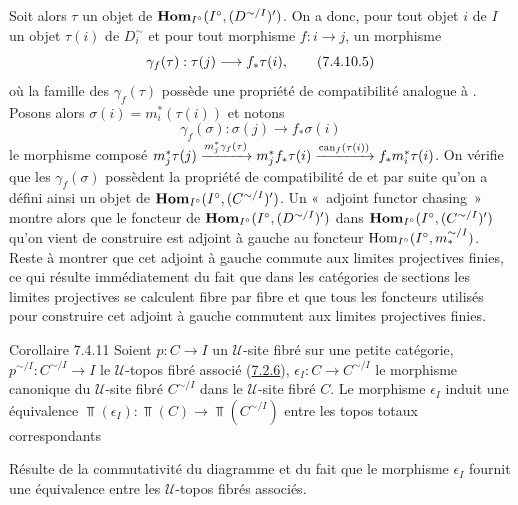 \documentclass[10pt]{../fichiers-configuration-latex/smfart}
\begin{document}
Soit alors $\tau$ un objet de $\operatorname{\mathbf{Hom}}_{I^{\circ}} (I^{\circ},
(D^{\sim/I})')$. On a donc, pour tout objet $i$ de $I$ un objet
$\tau(i)$ de $D^{\sim}_i$ et pour tout morphisme $f : i \to j$, un
morphisme
\begin{equation*}
\gamma_{f} (\tau) : \tau(j) \to f_{\ast} \tau(i){\quoi},\tag{7.4.10.5}
\end{equation*}
où la famille des $\gamma_f(\tau)$ possède une propriété de
compatibilité analogue à . Posons alors $\sigma(i) =
m^{\ast}_i (\tau(i))$ et notons
\begin{equation*}
\gamma_{f} (\sigma) : \sigma(j) \to f_{\ast} \sigma(i)\tag{7.4.10.6}
\end{equation*}
le morphisme composé $m^{\ast}_j \tau(j) \xrightarrow{m_j^{\ast}
  \gamma_f(\tau)} m_j^{\ast} f_{\ast} \tau(i) \xrightarrow{\operatorname{can}_f(\tau(i))}
f_{\ast} m^{\ast}_i \tau(i)$. On vérifie
  que les $\gamma_f(\sigma)$ possèdent la propriété de compatibilité
  de  et par suite qu'on a défini ainsi un objet de
  $\operatorname{\mathbf{Hom}}_{I^{\circ}}(I^{\circ}, (C^{\sim/I})')$. Un « adjoint functor
  chasing » montre alors que le foncteur de
  $\operatorname{\mathbf{Hom}}_{I^{\circ}}(I^{\circ}, (D^{\sim/I})')$ dans
  $\operatorname{\mathbf{Hom}}_{I^{\circ}}(I^{\circ}, (C^{\sim/I})')$ qu'on vient de
  construire est adjoint à gauche au foncteur
  $\operatorname{Hom}_{I^{\circ}}(I^{\circ}, m^{\sim/I}_{\ast})$. Reste à montrer
  que cet adjoint à gauche commute aux limites projectives finies, ce
  qui résulte immédiatement du fait que dans les catégories de
  sections les limites projectives se calculent fibre par fibre et que
  tous les foncteurs utilisés pour construire cet adjoint à gauche
  commutent aux limites projectives finies.

\begin{enonce*}{Corollaire 7.4.11}
Soient $p : C \to I$ un $𝒰$-site fibré sur une petite catégorie,
$p^{\sim/I} : C^{\sim/I} \to I$ le $𝒰$-topos fibré associé (\hyperref[VI.subsubsec7.2.6]{7.2.6}),
$\epsilon_I : C \to C^{\sim/I}$ le morphisme canonique du $𝒰$-site
fibré $C^{\sim/I}$ dans le $𝒰$-site fibré $C$. Le morphisme $\epsilon_{I}$ induit une équivalence
$\Top(\epsilon_I) : \Top(C) \to \Top(C^{\sim/I})$ entre les topos
totaux correspondants
\end{enonce*}

Résulte de la commutativité du diagramme 
et du fait que le morphisme $\epsilon_{I}$ fournit une équivalence
entre les $𝒰$-topos fibrés associés.
\end{document}
